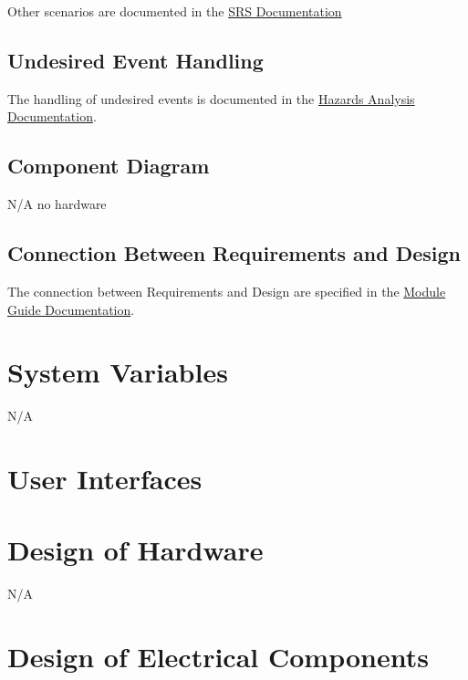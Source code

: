 \documentclass[12pt, titlepage]{article}
\begin{document}
\noindent
Other scenarios are documented in the \href{https://github.com/davimang/REACH/blob/main/docs/SRS/SRS.pdf}{SRS Documentation}

\subsection{Undesired Event Handling}

The handling of undesired events is documented in the \href{https://github.com/davimang/REACH/blob/main/docs/HazardAnalysis/HazardAnalysis.pdf}{Hazards Analysis Documentation}.

\subsection{Component Diagram}

N/A no hardware

\subsection{Connection Between Requirements and Design} \label{SecConnection}

The connection between Requirements and Design are specified in the \href{https://github.com/davimang/REACH/blob/main/docs/Design/SoftArchitecture/MG.pdf}{Module Guide Documentation}.

\section{System Variables}

N/A

\section{User Interfaces}


\section{Design of Hardware}

N/A

\section{Design of Electrical Components}
\end{document}
